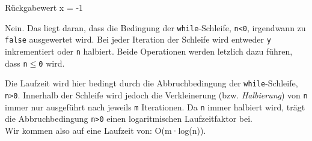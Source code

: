 \begin{aufgabe}
\begin{teile}
	Rückgabewert x = -1 \\

	\item
	Nein. Das liegt daran, dass die Bedingung der {\larger\texttt{while}}-Schleife, {\larger\texttt{n<0}}, irgendwann zu {\larger\texttt{false}} ausgewertet wird.
	Bei jeder Iteration der Schleife wird entweder {\larger\texttt{y}} inkrementiert oder {\larger\texttt{n}} halbiert. Beide Operationen werden letzlich dazu führen, dass {\larger\texttt{n$\leq$0}} wird. \\
	
	\item
	Die Laufzeit wird hier bedingt durch die Abbruchbedingung der {\larger\texttt{while}}-Schleife, {\larger\texttt{n>0}}.
	Innerhalb der Schleife wird jedoch die Verkleinerung (bzw. \textit{Halbierung}) von {\larger\texttt{n}} immer nur ausgeführt nach jeweils {\larger\texttt{m}} Iterationen.
	Da {\larger\texttt{n}} immer halbiert wird, trägt die Abbruchbedingung {\larger\texttt{n>0}} einen logaritmischen Laufzeitfaktor bei. \\
	Wir kommen also auf eine Laufzeit von: O(m·log(n)).
	
\end{teile}
\end{aufgabe}

